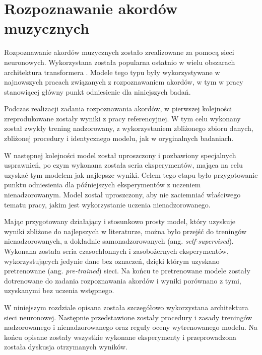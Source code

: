 \chapter{Rozpoznawanie akordów muzycznych}

Rozpoznawanie akordów muzycznych zostało zrealizowane za pomocą sieci neuronowych. Wykorzystana
została popularna ostatnio w wielu obszarach architektura transformera
\cite{vaswani_attention_2017}. Modele tego typu były wykorzystywane w najnowszych pracach związanych
z rozpoznawaniem akordów, w tym w pracy \cite{park_bi-directional_2019} stanowiącej główny punkt
odniesienie dla niniejszych badań.

Podczas realizacji zadania rozpoznawania akordów, w pierwszej kolejności zreprodukowane zostały
wyniki z pracy referencyjnej. W tym celu wykonany został zwykły trening nadzorowany, z
wykorzystaniem zbliżonego zbioru danych, zbliżonej procedury i identycznego modelu, jak w
oryginalnych badaniach.

W następnej kolejności model został uproszczony i pozbawiony specjalnych usprawnień, po czym wykonana
została seria eksperymentów, mająca na celu uzyskać tym modelem jak najlepsze wyniki. Celem tego
etapu było przygotowanie punktu odniesienia dla późniejszych eksperymentów z uczeniem
nienadzorowanym. Model został uproszczony, aby nie zaciemniać właściwego tematu pracy, jakim jest
wykorzystanie uczenia nienadzorowanego.

Mając przygotowany działający i stosunkowo prosty model, który uzyskuje wyniki zbliżone do
najlepszych w literaturze, można było przejść do treningów nienadzorowanych, a dokładnie
samonadzorowanych (ang. \emph{self-supervised}). Wykonana została seria czasochłonnych i
zasobożernych eksperymentów, wykorzystujących jedynie dane bez oznaczeń, dzięki którym uzyskano
pretrenowane (ang. \emph{pre-trained}) sieci. Na końcu te pretrenowane modele zostały dotrenowane do
zadania rozpoznawania akordów i wyniki porównano z tymi, uzyskanymi bez uczenia wstępnego.

W niniejszym rozdziale opisana została szczegółowo wykorzystana architektura sieci neuronowej.
Następnie przedstawione zostały procedury i zasady treningów nadzorowanego i nienadzorowanego oraz
reguły oceny wytrenowanego modelu. Na końcu opisane zostały wszystkie wykonane eksperymenty i
przeprowadzona została dyskusja otrzymanych wyników.

